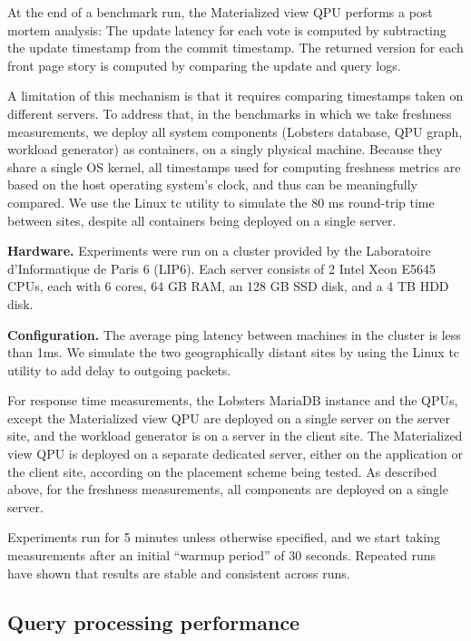 At the end of a benchmark run, the Materialized view QPU performs a post mortem analysis:
The update latency for each vote is computed by subtracting the update timestamp from the commit timestamp.
The returned version for each front page story is computed by comparing the update and query logs.

A limitation of this mechanism is that it requires comparing timestamps taken on different servers.
To address that, in the benchmarks in which we take freshness measurements,
we deploy all system components (Lobsters database, QPU graph, workload generator) as containers,
on a singly physical machine.
Because they share a single OS kernel, all timestamps used for computing freshness metrics are based
on the host operating system's clock, and thus can be meaningfully compared.
We use the Linux tc utility \cite{tc} to simulate the 80 ms round-trip time between sites,
despite all containers being deployed on a single server.

\bigskip
\noindent
\textbf{Hardware.}
Experiments were run on a cluster provided by the Laboratoire d'Informatique de Paris 6 (LIP6).
Each server consists of 2 Intel Xeon E5645 CPUs, each with 6 cores, 64 GB RAM, an 128 GB SSD disk, and a 4 TB HDD disk.

\bigskip
\noindent
\textbf{Configuration.}
The average ping latency between machines in the cluster is less than 1ms.
We simulate the two geographically distant sites by using the Linux tc utility \cite{tc} to add delay to outgoing packets.

For response time measurements, the Lobsters MariaDB instance and the QPUs, except the Materialized view QPU are deployed
on a single server on the server site, and the workload generator is on a server in the client site.
The Materialized view QPU is deployed on a separate dedicated server, either on the application or the client site,
according on the placement scheme being tested.
As described above, for the freshness measurements, all components are deployed on a single server.

Experiments run for 5 minutes unless otherwise specified, and we start taking measurements after an initial
``warmup period'' of 30 seconds.
Repeated runs have shown that results are stable and consistent across runs.


\subsection{Query processing performance}
\label{sec:eval_query_processing_perf}

